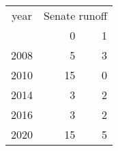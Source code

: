\footnotesize\begin{tabular}[t]{lrr}
\toprule
\multicolumn{1}{c}{year} & \multicolumn{2}{c}{Senate runoff} \\
\cmidrule(l{3pt}r{3pt}){1-1} \cmidrule(l{3pt}r{3pt}){2-3}
  & 0 & 1\\
\midrule
2008 & 5 & 3\\
2010 & 15 & 0\\
2014 & 3 & 2\\
2016 & 3 & 2\\
2020 & 15 & 5\\
\bottomrule
\end{tabular}
